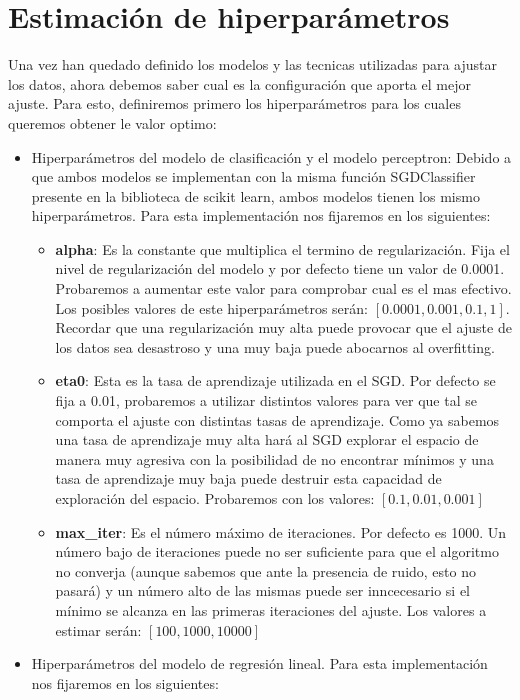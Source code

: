 \section{Estimación de hiperparámetros}
Una vez han quedado definido los modelos y las tecnicas utilizadas para ajustar los datos, ahora debemos saber cual es la configuración que aporta el mejor ajuste. Para esto, definiremos primero los hiperparámetros para los cuales queremos obtener le valor optimo:
\begin{itemize}
   \item Hiperparámetros del modelo de clasificación y el modelo perceptron: Debido a que ambos modelos se implementan con la misma función SGDClassifier presente en la biblioteca de scikit learn, ambos modelos tienen los mismo hiperparámetros. Para esta implementación nos fijaremos en los siguientes\cite{SGDClassifier}:
   \begin{itemize}
      \item \textbf{alpha}: Es la constante que multiplica el termino de regularización. Fija el nivel de regularización del modelo y por defecto tiene un valor de 0.0001. Probaremos a aumentar este valor para comprobar cual es el mas efectivo. Los posibles valores de este hiperparámetros serán: $[0.0001, 0.001, 0.1, 1]$. Recordar que una regularización muy alta puede provocar que el ajuste de los datos sea desastroso y una muy baja puede abocarnos al overfitting.
      \item \textbf{eta0}: Esta es la tasa de aprendizaje utilizada en el SGD. Por defecto se fija a 0.01, probaremos a utilizar distintos valores para ver que tal se comporta el ajuste con distintas tasas de aprendizaje. Como ya sabemos una tasa de aprendizaje muy alta hará al SGD explorar el espacio de manera muy agresiva con la posibilidad de no encontrar mínimos y una tasa de aprendizaje muy baja puede destruir esta capacidad de exploración del espacio. Probaremos con los valores: $[0.1, 0.01, 0.001]$
      \item \textbf{max\_iter}: Es el número máximo de iteraciones. Por defecto es 1000. Un número bajo de iteraciones puede no ser suficiente para que el algoritmo no converja (aunque sabemos que ante la presencia de ruido, esto no pasará) y un número alto de las mismas puede ser inncecesario si el mínimo se alcanza en las primeras iteraciones del ajuste. Los valores a estimar serán: $[100, 1000, 10000]$
   \end{itemize}
   \item Hiperparámetros del modelo de regresión lineal. Para esta implementación nos fijaremos en los siguientes\cite{logisticRegression}:

\end{itemize}
